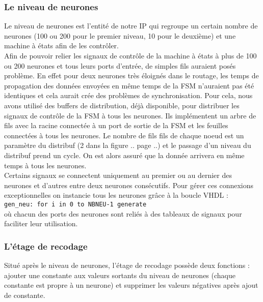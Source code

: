 \subsubsection{Le niveau de neurones}
Le niveau de neurones est l'entité de notre IP qui regroupe un certain nombre
de neurones (100 ou 200 pour le premier niveau, 10 pour le deuxième) et une
machine à états afin de les contrôler. \\
Afin de pouvoir relier les signaux de contrôle de la machine à états à plus de
100 ou 200 neurones et tous leurs ports d'entrée, de simples fils auraient posés
problème. En effet pour deux neurones très éloignés dans le routage, les temps
de propagation des données envoyées en même temps de la FSM n'auraient pas été
identiques et cela aurait crée des problèmes de synchronisation. Pour cela, nous
avons utilisé des buffers de distribution, déjà disponible, pour distribuer les
signaux de contrôle de la FSM à tous les neurones. Ils implémentent un arbre
de fils avec la racine connectée à un port de sortie de la FSM et les feuilles
connectées à tous les neurones. Le nombre de fils fils de chaque noeud est un
paramètre du distribuf (2 dans la figure .. page ..) et le passage d'un niveau
du distribuf prend un cycle. On est alors assuré que la donnée arrivera en même
temps à tous les neurones. \\
Certains signaux se connectent uniquement au premier ou au dernier des neurones
et d'autres entre deux neurones consécutifs. Pour gérer ces connexions
exceptionnelles on instancie tous les neurones grâce à la boucle VHDL :\\
\texttt{gen\_neu: for i in 0 to NBNEU-1 generate} \\
où chacun des ports des neurones sont reliés à des tableaux de signaux pour
faciliter leur utilisation.

\subsubsection{L'étage de recodage}
\label{plan:recode}

Situé après le niveau de neurones, l'étage de recodage possède deux fonctions :
ajouter une constante aux valeurs sortants du niveau de neurones (chaque
constante est propre à un neurone) et
supprimer les valeurs négatives après ajout de constante.

